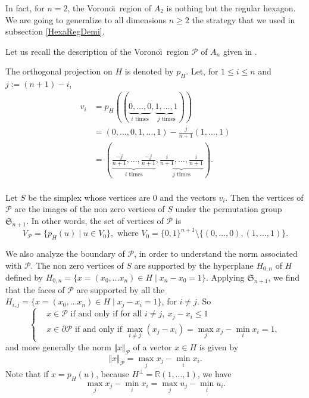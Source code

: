 \documentclass{amsart}                     %
\newcommand{\R}{{\mathbb R}}
\begin{document}
 In fact, for $n=2$, the Vorono\"\i\  region of $A_2$ is nothing but the regular hexagon. We are going to generalize to all dimensions $n\geq 2$ the strategy that we used in subsection \ref{HexaRegDemi}.

Let us recall the description of the Vorono\"\i\  region $\mathcal{P}$
of $A_n$ given in \cite[Chapter 21, section 3]{Conway:1987:SLG:39091}. 

The orthogonal projection on $H$ is denoted by $p_H$.  Let, for $1\leq i\leq n$ and $j:=(n+1)-i$, 
$$\begin{aligned} v_i&=
 p_H((\underbrace{0,\ldots,0}_{i \text{ times}},\underbrace{1,\ldots ,1}_{j \text{ times}}))\\
&= ({0,\ldots,0},{1,\ldots ,1}) - \frac{j}{n+1} (1,\ldots ,1) \\ 
&=(\underbrace{\frac{-j}{n+1},\ldots,\frac{-j}{n+1}}_{i \text{ times}},\underbrace{\frac{i}{n+1},\ldots, \frac{i}{n+1}}_{j \text{ times}}).\\ 
 \end{aligned}$$

Let $S$ be the simplex whose vertices are $0$ and the vectors $v_i$. 
Then the vertices of $\mathcal{P}$ are the images of the non zero vertices of $S$ under the permutation group $\mathfrak{S}_{n+1}$. In other words, the set of vertices of $\mathcal{P}$ is 
$$V_\mathcal{P}=\{p_H(u) \mid u\in V_0 \}, \text{ where } V_0=\{0,1\}^{n+1} \setminus \{ (0,\ldots,0),(1,\ldots,1) \}.$$

We also analyze the boundary of $\mathcal{P}$, in order to understand the norm associated with $\mathcal{P}$. The non zero vertices of $S$ are supported by the hyperplane $H_{0,n}$ of $H$ defined by $H_{0,n}=\{ x=(x_0,\ldots x_n)\in H\mid x_n-x_0=1\}$. Applying $\mathfrak{S}_{n+1}$, we find that the faces of $\mathcal{P}$ are supported by all the $H_{i,j}=\{ x=(x_0,\ldots x_n)\in H\mid x_j-x_i=1\}$, for $i\neq j$. So $$\begin{cases} & x\in \mathcal{P} \text{ if and only if for all } i\neq j,\  x_j-x_i\leq 1 \\ &  x\in \partial \mathcal{P} \text{ if and only if  } \max_{i\neq j} (x_j-x_i) = \max_j x_j - \min_i x_i =1, \end{cases}$$
and more generally the norm $\Vert x\Vert_\mathcal{P}$ of a vector $x\in H$ is given by
$$ \Vert  x\Vert  _\mathcal{P} = \max_j x_j - \min_i x_i .$$
Note that if $x=p_H(u)$, because $H^{\perp}=\R (1,\dots,1)$, we have  $${\max_j x_j - \min_i x_i = \max_j u_j - \min_i u_i}.$$
\end{document}
